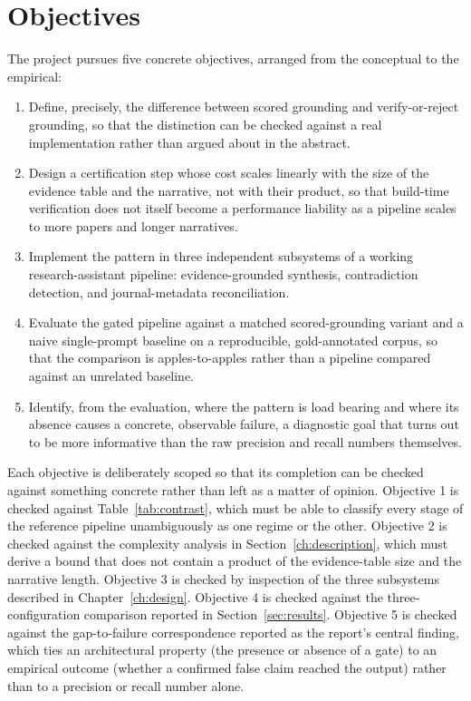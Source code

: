 \documentclass[12pt,a4paper]{report}
\begin{document}
\section{Objectives}
\label{sec:objectives-intro}
The project pursues five concrete objectives, arranged from the conceptual to
the empirical:
\begin{enumerate}
  \item Define, precisely, the difference between scored grounding and
        verify-or-reject grounding, so that the distinction can be checked
        against a real implementation rather than argued about in the abstract.
  \item Design a certification step whose cost scales linearly with the size of
        the evidence table and the narrative, not with their product, so that
        build-time verification does not itself become a performance liability
        as a pipeline scales to more papers and longer narratives.
  \item Implement the pattern in three independent subsystems of a working
        research-assistant pipeline: evidence-grounded synthesis, contradiction
        detection, and journal-metadata reconciliation.
  \item Evaluate the gated pipeline against a matched scored-grounding variant
        and a naive single-prompt baseline on a reproducible, gold-annotated
        corpus, so that the comparison is apples-to-apples rather than a
        pipeline compared against an unrelated baseline.
  \item Identify, from the evaluation, where the pattern is load bearing and
        where its absence causes a concrete, observable failure, a diagnostic
        goal that turns out to be more informative than the raw precision and
        recall numbers themselves.
\end{enumerate}

Each objective is deliberately scoped so that its completion can be checked
against something concrete rather than left as a matter of opinion. Objective
1 is checked against Table~\ref{tab:contrast}, which must be able to classify
every stage of the reference pipeline unambiguously as one regime or the
other. Objective 2 is checked against the complexity analysis in
Section~\ref{ch:description}, which must derive a bound that does not contain
a product of the evidence-table size and the narrative length. Objective 3 is
checked by inspection of the three subsystems described in
Chapter~\ref{ch:design}. Objective 4 is checked against the three-configuration
comparison reported in Section~\ref{sec:results}. Objective 5 is checked
against the gap-to-failure correspondence reported as the report's central
finding, which ties an architectural property (the presence or absence of a
gate) to an empirical outcome (whether a confirmed false claim reached the
output) rather than to a precision or recall number alone.
\end{document}
